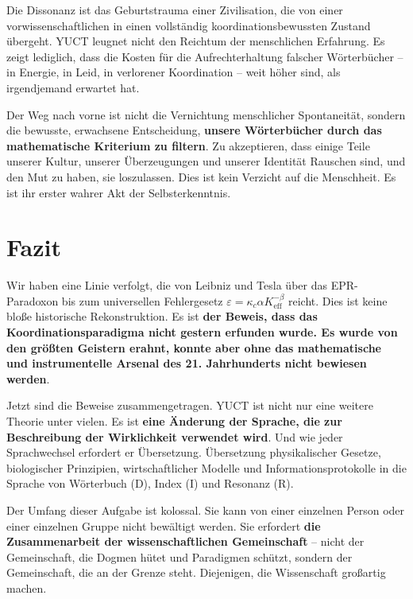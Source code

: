 \documentclass[12pt,a4paper]{article}
\begin{document}
Die Dissonanz ist das Geburtstrauma einer Zivilisation, die von einer vorwissenschaftlichen in einen vollständig koordinationsbewussten Zustand übergeht. YUCT leugnet nicht den Reichtum der menschlichen Erfahrung. Es zeigt lediglich, dass die Kosten für die Aufrechterhaltung falscher Wörterbücher – in Energie, in Leid, in verlorener Koordination – weit höher sind, als irgendjemand erwartet hat.

Der Weg nach vorne ist nicht die Vernichtung menschlicher Spontaneität, sondern die bewusste, erwachsene Entscheidung, \textbf{unsere Wörterbücher durch das mathematische Kriterium zu filtern}. Zu akzeptieren, dass einige Teile unserer Kultur, unserer Überzeugungen und unserer Identität Rauschen sind, und den Mut zu haben, sie loszulassen. Dies ist kein Verzicht auf die Menschheit. Es ist ihr erster wahrer Akt der Selbsterkenntnis.

\section{Fazit}

Wir haben eine Linie verfolgt, die von Leibniz und Tesla über das EPR-Paradoxon bis zum universellen Fehlergesetz \(\varepsilon = \kappa_c \alpha K_{\mathrm{eff}}^{-\beta}\) reicht. Dies ist keine bloße historische Rekonstruktion. Es ist \textbf{der Beweis, dass das Koordinationsparadigma nicht gestern erfunden wurde. Es wurde von den größten Geistern erahnt, konnte aber ohne das mathematische und instrumentelle Arsenal des 21. Jahrhunderts nicht bewiesen werden}.

Jetzt sind die Beweise zusammengetragen. YUCT ist nicht nur eine weitere Theorie unter vielen. Es ist \textbf{eine Änderung der Sprache, die zur Beschreibung der Wirklichkeit verwendet wird}. Und wie jeder Sprachwechsel erfordert er Übersetzung. Übersetzung physikalischer Gesetze, biologischer Prinzipien, wirtschaftlicher Modelle und Informationsprotokolle in die Sprache von Wörterbuch (D), Index (I) und Resonanz (R).

Der Umfang dieser Aufgabe ist kolossal. Sie kann von einer einzelnen Person oder einer einzelnen Gruppe nicht bewältigt werden. Sie erfordert \textbf{die Zusammenarbeit der wissenschaftlichen Gemeinschaft} – nicht der Gemeinschaft, die Dogmen hütet und Paradigmen schützt, sondern der Gemeinschaft, die an der Grenze steht. Diejenigen, die Wissenschaft großartig machen.
\end{document}
